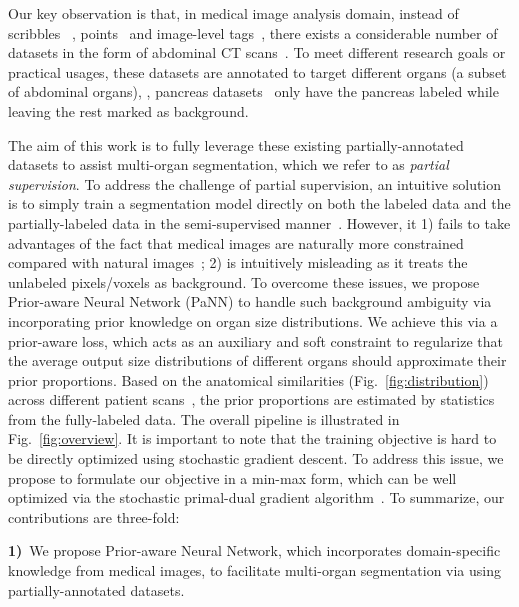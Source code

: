 \documentclass[10pt,twocolumn,letterpaper]{article}
\begin{document}
Our key observation is that, in medical image analysis domain, instead of scribbles~\cite{lin2016scribblesup,tang2018normalized,tang2018regularized} , points~\cite{bearman2016s} and image-level tags~\cite{papandreou2015weakly,pathak2014fully,xu2014tell}, there exists a considerable number of datasets in the form of abdominal CT scans~\cite{roth2015deeporgan, roth2018multi, simpson2019large}. To meet different research goals or practical usages, these datasets are annotated to target different organs (a subset of abdominal organs), \eg, pancreas datasets~\cite{roth2015deeporgan} only have the pancreas labeled while leaving the rest marked as background. 

The aim of this work is to fully leverage these existing partially-annotated datasets to assist multi-organ segmentation, which we refer to as \emph{partial supervision}. 
To address the challenge of partial supervision, an intuitive solution is to simply train a segmentation model directly on both the labeled data and the partially-labeled data in the semi-supervised manner~\cite{rajchl2017deepcut, bai2017semi, papandreou2015weakly}. However, it 1) fails to take advantages of the fact that medical images are naturally more constrained compared with natural images~\cite{nosrati2016incorporating}; 2) is intuitively misleading as it treats the unlabeled pixels/voxels as background. To overcome these issues, we propose Prior-aware Neural Network (PaNN) to handle such background ambiguity via incorporating prior knowledge on organ size distributions. We achieve this via a prior-aware loss, which acts as an auxiliary and soft constraint to regularize that the average output size distributions of different organs should approximate their prior proportions.  Based on the anatomical similarities (Fig.~\ref{fig:distribution}) across different patient scans~\cite{dalca2018anatomical, oktay2018anatomically, kervadec2019constrained}, the prior proportions are estimated by statistics from the fully-labeled data. The overall pipeline is illustrated in Fig.~\ref{fig:overview}.
It is important to note that the training objective is hard to be directly optimized using stochastic gradient descent.
To address this issue, we propose to formulate our objective in a min-max form, which can be well optimized via the stochastic primal-dual gradient algorithm~\cite{liu2017unsupervised}. To summarize, our contributions are three-fold:

\noindent\textbf{1)}~We propose Prior-aware Neural Network, which incorporates domain-specific knowledge from medical images, to facilitate multi-organ segmentation via using partially-annotated datasets.
\end{document}
